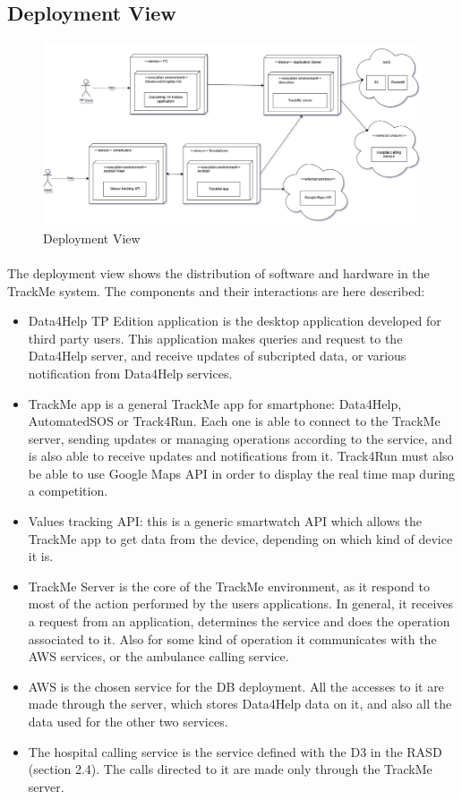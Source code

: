 \newpage
{\color{secblue}\subsection{Deployment View}}
\begin{figure}[H]
    \includegraphics[width=\linewidth, keepaspectratio]{./Images/deployment_view.png}
    \centering
    \caption{Deployment View}
    \label{fig:depview}
  \end{figure}

\paragraph{} The deployment view shows the distribution of software and hardware in the TrackMe system. The components and their interactions are here described:
\begin{itemize}
\item{Data4Help TP Edition application} is the desktop application developed for third party users. This application makes queries and request to the Data4Help server, and receive updates of subcripted data, or various notification from Data4Help services.
\item TrackMe app is a general TrackMe app for smartphone: Data4Help, AutomatedSOS or Track4Run. Each one is able to connect to the TrackMe server, sending updates or managing operations according to the service, and is also able to receive updates and notifications from it. Track4Run must also be able to use Google Maps API in order to display the real time map during a competition.
\item Values tracking API: this is a generic smartwatch API which allows the TrackMe app to get data from the device, depending on which kind of device it is.
\item TrackMe Server is the core of the TrackMe environment, as it respond to most of the action performed by the users applications. In general, it receives a request from an application, determines the service and does the operation associated to it. Also for some kind of operation it communicates with the AWS services, or the ambulance calling service.
\item AWS is the chosen service for the DB deployment. All the accesses to it are made through the server, which stores Data4Help data on it, and also all the data used for the other two services.
\item The hospital calling service is the service defined with the D3 in the RASD (section 2.4). The calls directed to it are made only through the TrackMe server.
\end{itemize}